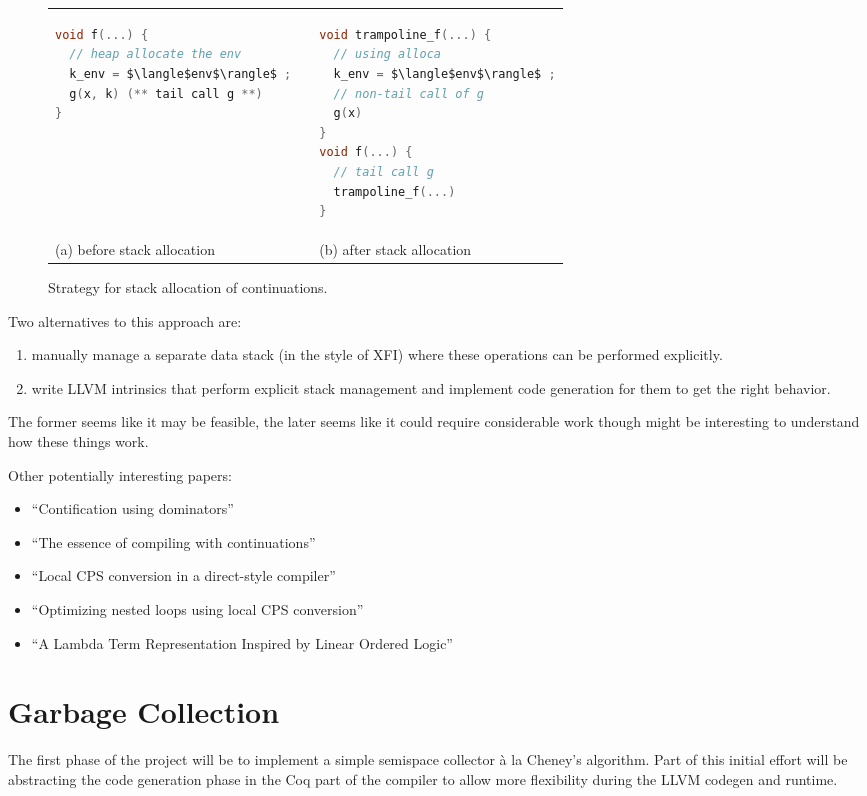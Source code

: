 \documentclass{article}
\begin{document}
\begin{figure}
\begin{tabular}{p{} c p{}}
\begin{lstlisting}[language=c]
void f(...) { 
  // heap allocate the env
  k_env = $\langle$env$\rangle$ ;
  g(x, k) (** tail call g **)
}
\end{lstlisting}
& \quad
& 
\begin{lstlisting}[language=c]
void trampoline_f(...) {
  // using alloca
  k_env = $\langle$env$\rangle$ ;
  // non-tail call of g
  g(x)
}
void f(...) {
  // tail call g
  trampoline_f(...)
}
\end{lstlisting}
\\
(a) before stack allocation & &
(b) after stack allocation \\ 
\end{tabular}
\caption{Strategy for stack allocation of continuations.}
\label{fig:stack-alloc}
\end{figure}

Two alternatives to this approach are:
\begin{enumerate}
\item manually manage a separate data stack (in the style of XFI) where these operations can be performed explicitly.
\item write LLVM intrinsics that perform explicit stack management and implement code generation for them to get the right behavior.
\end{enumerate}
The former seems like it may be feasible, the later seems like it could require considerable work though might be interesting to understand how these things work.

Other potentially interesting papers:
\begin{itemize}
\item ``Contification using dominators''~\cite{fluet01contification}
\item ``The essence of compiling with continuations''~\cite{flanagan04essence}
\item ``Local CPS conversion in a direct-style compiler''~\cite{reppy01local}
\item ``Optimizing nested loops using local CPS conversion''~\cite{reppy02optimizing}
\item ``A Lambda Term Representation Inspired by Linear Ordered Logic''~\cite{abel11lambda}
\end{itemize}

\section{Garbage Collection}
\label{sec:gc}
The first phase of the project will be to implement a simple semispace collector \`a la Cheney's algorithm. Part of this initial effort will be abstracting the code generation phase in the Coq part of the compiler to allow more flexibility during the LLVM codegen and runtime.
\end{document}
